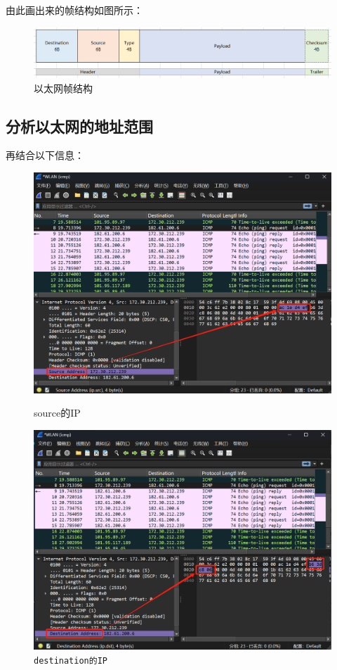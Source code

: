 \documentclass{article}
\begin{document}
	由此画出来的帧结构如图所示：
	
	\begin{figure}[H]
		\centering
		\includegraphics[width=15cm]{images/12.以太网帧结构.jpg}
		\caption{以太网帧结构}
	\end{figure}
	
	\subsection{分析以太网的地址范围}
	
	再结合以下信息：
	
	\begin{figure}[H]
		\centering
		\begin{minipage}[b]{0.45\textwidth}
			\includegraphics[width=\textwidth]{images/10.source的IP.png}
			\caption{source的IP}
		\end{minipage}
		\hfill
		\begin{minipage}[b]{0.45\textwidth}
			\includegraphics[width=\textwidth]{images/11.destination的IP.png}
			\caption{\texttt{destination的IP}}
		\end{minipage}
	\end{figure}
	
\end{document}
